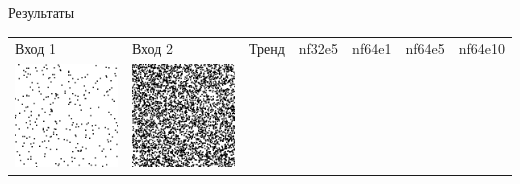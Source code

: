 \documentclass[12pt]{beamer}
\begin{document}
	\begin{frame}{Результаты}
		\begin{table}
			\begin{center}
				\begin{tabular}{p{1.2cm} p{1.2cm} p{1.2cm} p{1.2cm} p{1.2cm} p{1.2cm} p{1.2cm}}
					\toprule
					Вход 1 & Вход 2 & Тренд & nf32e5 & nf64e1 & nf64e5 & nf64e10 \\
					\cmidrule(r){1-1}\cmidrule(lr){2-2}\cmidrule(lr){3-3}\cmidrule(lr){4-4}\cmidrule(lr){5-5}\cmidrule(lr){6-6}\cmidrule(l){7-7}
					\includegraphics[width=1\linewidth]{8-results/sand-trend8/left1}
					&
					\includegraphics[width=1\linewidth]{8-results/sand-trend8/right1}

\end{tabular}
\end{center}
\end{table}
\end{frame}
\end{document}
